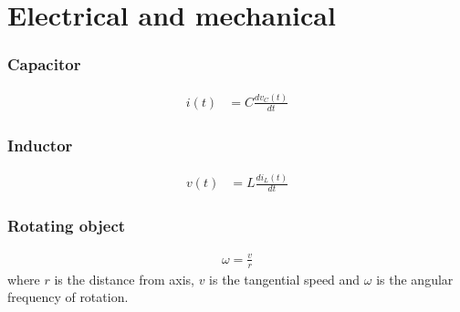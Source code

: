 \part{Electrical and mechanical}

\section{Capacitor}
\begin{align}
    i(t) &= C \frac{dv_C(t)}{dt}
\end{align}

\section{Inductor}
\begin{align}
    v(t) &= L \frac{di_L(t)}{dt}
\end{align}

\section{Rotating object}
\begin{align}
    \omega = \frac{v}{r}
\end{align}
where $r$ is the distance from axis, $v$ is the tangential speed and $\omega$ is the angular frequency of rotation.
